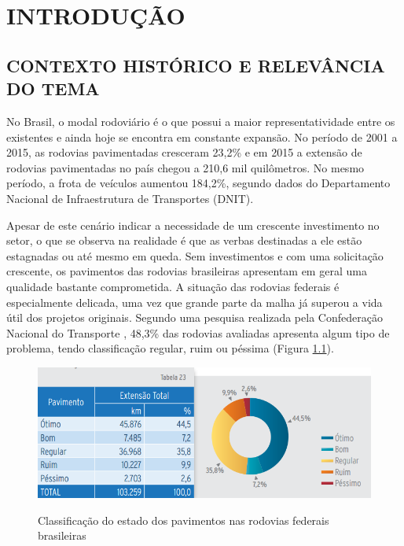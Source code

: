 \chapter{INTRODUÇÃO}\label{CAP:introducao}

\section{CONTEXTO HISTÓRICO E RELEVÂNCIA DO TEMA}
No Brasil, o modal rodoviário é o que possui a maior representatividade entre os existentes e ainda hoje se encontra em constante expansão. No período de 2001 a 2015, as rodovias pavimentadas cresceram 23,2\% e em 2015 a extensão de rodovias pavimentadas no país chegou a 210,6 mil quilômetros. No mesmo período, a frota de veículos aumentou 184,2\%, segundo dados do Departamento Nacional de Infraestrutura de Transportes (DNIT). 

Apesar de este cenário indicar a necessidade de um crescente investimento no setor, o que se observa na realidade é que as verbas destinadas a ele estão estagnadas ou até mesmo em queda. Sem investimentos e com uma solicitação crescente, os pavimentos das rodovias brasileiras apresentam em geral uma qualidade bastante comprometida. A situação das rodovias federais é especialmente delicada, uma vez que grande parte da malha já superou a vida útil dos projetos originais. Segundo uma pesquisa realizada pela Confederação Nacional do Transporte \cite{cnt}, 48,3\% das rodovias avaliadas apresenta algum tipo de problema, tendo classificação regular, ruim ou péssima (Figura \ref{Fig:class}). 

\begin{figure}[!ht]
\centering
\caption{Classificação do estado dos pavimentos nas rodovias federais brasileiras}
{\includegraphics[scale=0.7]{figures/class.jpg}}\\
\label{Fig:class}
\end{figure}

